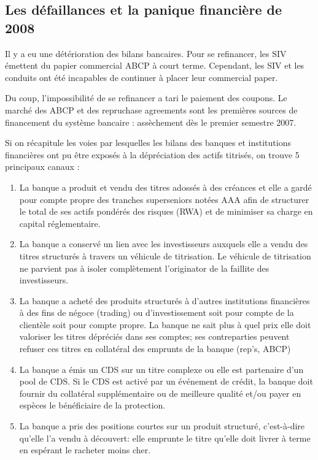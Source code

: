 	\subsection{Les défaillances et la panique financière de 2008}
	
	Il y a eu une détérioration des bilans bancaires. Pour se refinancer, les SIV émettent du papier commercial ABCP à court 
terme. Cependant, les SIV et les conduits ont été incapables de continuer à placer leur commercial paper.

	Du coup, l'impossibilité de se refinancer a tari le paiement des coupons. Le marché des ABCP et des repruchase agreements sont les premières sources de financement du système bancaire : assèchement dès le premier semestre 2007.
	
	
	Si on récapitule les voies par lesquelles les bilans des banques et 
institutions financières ont pu être exposés à la dépréciation des actifs titrisés, on trouve 5 principaux canaux :

	\begin{enumerate}
		\item La banque a produit et vendu des titres adossés à des créances et elle a gardé pour compte propre des tranches superseniors notées AAA afin de structurer le total de ses actifs pondérés des risques (RWA) et de minimiser sa charge en capital réglementaire.
		\item La banque a conservé un lien avec les investisseurs auxquels elle a vendu des titres structurés à travers un véhicule de titrisation. Le véhicule de titrisation ne parvient pas à isoler complètement l'originator de la faillite des investisseurs. 
		\item La banque a acheté des produits structurés à d’autres institutions 
financières à des fins de négoce (trading) ou d’investissement soit pour compte de la clientèle soit pour compte propre. La banque ne sait plus à quel prix elle doit valoriser les titres dépréciés dans ses comptes; ses contreparties peuvent refuser ces titres en collatéral des emprunts de la banque (rep's, ABCP) 
		\item La banque a émis un CDS sur un titre complexe ou elle est partenaire d'un pool de CDS. Si le CDS est activé par un événement de crédit, la banque doit fournir du collatéral supplémentaire ou de meilleure qualité et/ou payer en espèces le bénéficiaire de la protection. 
		\item La banque a pris des positions courtes sur un produit structuré, c'est-à-dire qu'elle l'a vendu à découvert: elle emprunte le titre qu'elle doit livrer à terme en espérant le racheter moins cher.
	\end{enumerate}
